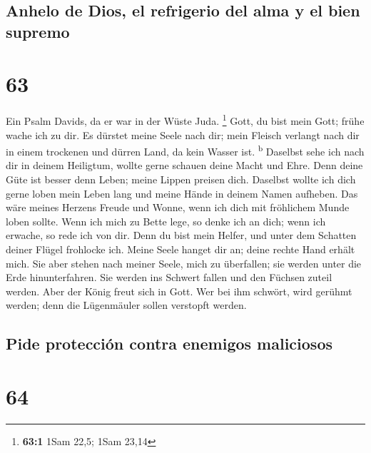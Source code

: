 \hypertarget{anhelo-de-dios-el-refrigerio-del-alma-y-el-bien-supremo}{%
\subsection{Anhelo de Dios, el refrigerio del alma y el bien
supremo}\label{anhelo-de-dios-el-refrigerio-del-alma-y-el-bien-supremo}}

\hypertarget{section-62}{%
\section{63}\label{section-62}}

 Ein Psalm Davids, da er war in der Wüste Juda.
\footnote{\textbf{63:1} 1Sam 22,5; 1Sam 23,14}  Gott, du
bist mein Gott; frühe wache ich zu dir. Es dürstet meine Seele nach dir;
mein Fleisch verlangt nach dir in einem trockenen und dürren Land, da
kein Wasser ist. \textsuperscript{b}  Daselbst sehe ich
nach dir in deinem Heiligtum, wollte gerne schauen deine Macht und Ehre.
 Denn deine Güte ist besser denn Leben; meine Lippen
preisen dich.  Daselbst wollte ich dich gerne loben mein
Leben lang und meine Hände in deinem Namen aufheben.  Das
wäre meines Herzens Freude und Wonne, wenn ich dich mit fröhlichem Munde
loben sollte.  Wenn ich mich zu Bette lege, so denke ich
an dich; wenn ich erwache, so rede ich von dir.  Denn du
bist mein Helfer, und unter dem Schatten deiner Flügel frohlocke ich.
 Meine Seele hanget dir an; deine rechte Hand erhält mich.
 Sie aber stehen nach meiner Seele, mich zu überfallen;
sie werden unter die Erde hinunterfahren.  Sie werden ins
Schwert fallen und den Füchsen zuteil werden.  Aber der
König freut sich in Gott. Wer bei ihm schwört, wird gerühmt werden; denn
die Lügenmäuler sollen verstopft werden.

\hypertarget{pide-protecciuxf3n-contra-enemigos-maliciosos}{%
\subsection{Pide protección contra enemigos
maliciosos}\label{pide-protecciuxf3n-contra-enemigos-maliciosos}}

\hypertarget{section-63}{%
\section{64}\label{section-63}}

